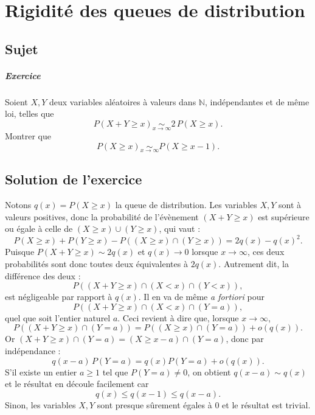 \chapter{Rigidité des queues de distribution}

\section{Sujet}

\paragraph{Exercice}

Soient $X,Y$ deux variables aléatoires à valeurs dans $\mathbb N$, indépendantes et de même loi, telles que
$$
P(X+Y \geqslant x) \underset{x\to\infty}\sim 2\,P(X \geqslant x).
$$
Montrer que
$$
P(X \geqslant x) \underset{x\to\infty}\sim P(X \geqslant x-1).
$$

\section{Solution de l'exercice}

Notons $q(x) = P(X \geqslant x)$ la queue de distribution. Les variables $X,Y$ sont à valeurs positives, donc la probabilité de l'évènement $(X + Y \geqslant x)$ est supérieure ou égale à celle de $(X\geqslant x) \cup (Y \geqslant x)$, qui vaut :
\[
P(X\geqslant x) + P(Y \geqslant x) - P((X\geqslant x) \cap (Y \geqslant x)) = 2q(x) - q(x)^2.
\]
Puisque $P(X+Y \geqslant x) \sim 2q(x)$ et $q(x) \to 0$  lorsque $x \to \infty$, ces deux probabilités sont donc toutes deux équivalentes à $2q(x)$. Autrement dit, la différence des deux :
\[
P((X + Y \geqslant x) \cap (X < x) \cap (Y < x)),
\]
est négligeable par rapport à $q(x)$. Il en va de même \textit{a fortiori} pour
\[
P((X + Y \geqslant x) \cap (X < x) \cap (Y = a)),
\]
quel que soit l'entier naturel $a$. Ceci revient à dire que, lorsque $x \to \infty$,
\[
P((X+Y \geqslant x) \cap (Y = a)) = P((X \geqslant x) \cap (Y = a)) + o(q(x)).
\]
Or $(X+Y \geqslant x) \cap (Y=a) = (X \geqslant x - a) \cap (Y=a)$, donc par indépendance :
\[
q(x-a)\,P(Y = a) = q(x) P(Y = a) + o(q(x)).
\]
S'il existe un entier $a \geqslant 1$ tel que $P(Y = a) \neq 0$, on obtient $q(x - a) \sim q(x)$ et le résultat en découle facilement car
\[
q(x) \leqslant q(x-1) \leqslant q(x-a).
\]
Sinon, les variables $X,Y$ sont presque sûrement égales à $0$ et le résultat est trivial.\\


